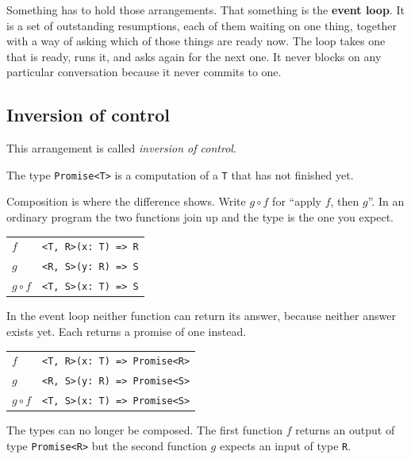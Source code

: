 \documentclass[11pt,a4paper]{article}
\begin{document}
Something has to hold those arrangements. That something is the \textbf{event loop}. It is a set of
outstanding resumptions, each of them waiting on one thing, together with a way of asking which of
those things are ready now. The loop takes one that is ready, runs it, and asks again for the next
one. It never blocks on any particular conversation because it never commits to one.

\subsection{Inversion of control}

This arrangement is called \emph{inversion of control}.

\begin{orestisbox}
The type \texttt{Promise<T>} is a computation of a \texttt{T} that has not finished yet.
\end{orestisbox}

Composition is where the difference shows. Write $g \circ f$ for ``apply $f$, then $g$''. In an
ordinary program the two functions join up and the type is the one you expect.

\begin{center}\small
\begin{tabular}{@{}ll@{}}
\toprule
$f$          & \texttt{<T, R>(x: T) => R} \\
$g$          & \texttt{<R, S>(y: R) => S} \\
$g \circ f$  & \texttt{<T, S>(x: T) => S} \\
\bottomrule
\end{tabular}
\end{center}

In the event loop neither function can return its answer, because neither answer exists yet. Each
returns a promise of one instead.

\begin{center}\small
\begin{tabular}{@{}ll@{}}
\toprule
$f$          & \texttt{<T, R>(x: T) => Promise<R>} \\
$g$          & \texttt{<R, S>(y: R) => Promise<S>} \\
$g \circ f$  & \texttt{<T, S>(x: T) => Promise<S>} \\
\bottomrule
\end{tabular}
\end{center}

The types can no longer be composed. The first function $f$ returns an output of type
\texttt{Promise<R>} but the second function $g$ expects an input of type \texttt{R}.
\end{document}
